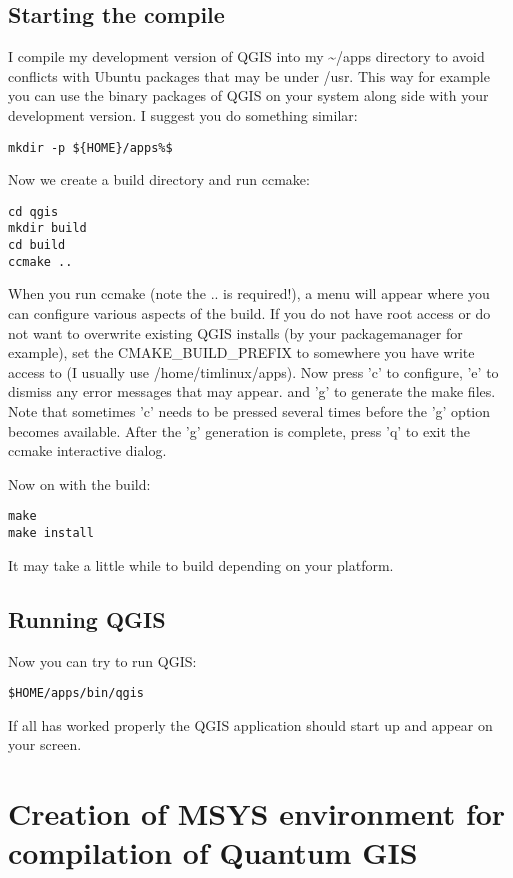 \subsection{Starting the compile}
I compile my development version of QGIS into my \~{}/apps directory to avoid
conflicts with Ubuntu packages that may be under /usr. This way for example
you can use the binary packages of QGIS on your system along side with your
development version. I suggest you do something similar:

\begin{verbatim}
mkdir -p ${HOME}/apps%$ 
\end{verbatim}

Now we create a build directory and run ccmake:

\begin{verbatim}
cd qgis
mkdir build
cd build
ccmake ..
\end{verbatim}

When you run ccmake (note the .. is required!), a menu will appear where 
you can configure various aspects of the build. If you do not have root
access or do not want to overwrite existing QGIS installs (by your
packagemanager for example), set the CMAKE\_BUILD\_PREFIX to somewhere you
have write access to (I usually use /home/timlinux/apps). Now press
'c' to configure, 'e' to dismiss any error messages that may appear.
and 'g' to generate the make files. Note that sometimes 'c' needs to 
be pressed several times before the 'g' option becomes available.
After the 'g' generation is complete, press 'q' to exit the ccmake 
interactive dialog.

Now on with the build:

\begin{verbatim}
make
make install
\end{verbatim}

It may take a little while to build depending on your platform.

\subsection{Running QGIS}
Now you can try to run QGIS:

\begin{verbatim}
$HOME/apps/bin/qgis 
\end{verbatim}

If all has worked properly the QGIS application should start up and appear
on your screen.


\section{Creation of MSYS environment for compilation of Quantum GIS}
